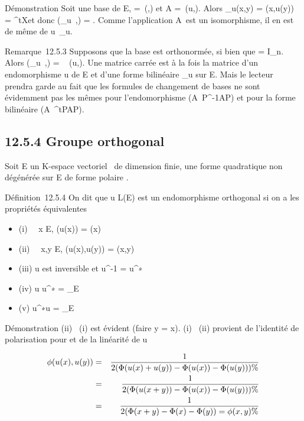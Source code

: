 \documentclass[]{article}
\begin{document}
Démonstration Soit  une base de E, \Omega =\
\mathrmMat (\phi,) et A =\
\mathrmMat (u,). Alors \psi_u(x,y) =
\phi(x,u(y)) = ^tX\OmegaAY et donc
\mathrmMat (\psi_u~,\mathcal{E})
= \OmegaA. Comme l'application A\mapsto~\OmegaA est un
isomorphisme, il en est de même de
u\mapsto~\psi_u.

Remarque~12.5.3 Supposons que la base  est orthonormée, si bien que \Omega =
I_n. Alors
\mathrmMat (\psi_u~,)
= \mathrmMat~ (u,\mathcal{E}). Une
matrice carrée est à la fois la matrice d'un endomorphisme u de E et
d'une forme bilinéaire \psi_u sur E. Mais le lecteur prendra garde
au fait que les formules de changement de bases ne sont évidemment pas
les mêmes pour l'endomorphisme
(A\mapsto~P^-1AP) et pour la forme
bilinéaire (A\mapsto~^tPAP).

\subsection{12.5.4 Groupe orthogonal}

Soit E un K-espace vectoriel ~de dimension finie, \Phi une forme
quadratique non dégénérée sur E de forme polaire \phi.

Définition~12.5.4 On dit que u \in L(E) est un endomorphisme orthogonal si
on a les propriétés équivalentes

\begin{itemize}
\itemsep1pt\parskip0pt
\item
  (i) \forall~~x \in E, \Phi(u(x)) = \Phi(x)
\item
  (ii) \forall~~x,y \in E, \phi(u(x),u(y)) = \phi(x,y)
\item
  (iii) u est inversible et u^-1 = u^∗
\item
  (iv) u \cdot u^∗ = \mathrmId_E
\item
  (v) u^∗\cdot u = \mathrmId_E
\end{itemize}

Démonstration (ii) \rigtharrow~(i) est évident (faire y = x). (i) \rigtharrow~(ii) provient de
l'identité de polarisation pour \Phi et de la linéarité de u

\begin{align*} \phi(u(x),u(y))& =& 1
\over 2 (\Phi(u(x) + u(y)) - \Phi(u(x)) - \Phi(u(y)))\%&
\\ & =& 1 \over 2
(\Phi(u(x + y)) - \Phi(u(x)) - \Phi(u(y))) \%& \\
& =& 1 \over 2 (\Phi(x + y) - \Phi(x) - \Phi(y)) = \phi(x,y)
\%& \\ \end{align*}
\end{document}
